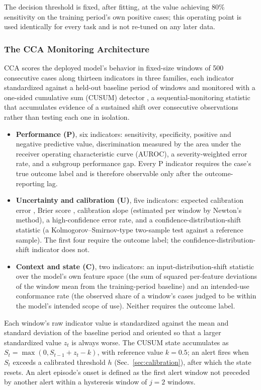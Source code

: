 \documentclass[preprintsapa,article,submit,oneauthor]{Definitions/mdpi}
\begin{document}
The decision threshold is fixed, after fitting, at the value achieving 80\% sensitivity on the training period's own positive cases; this operating point is used identically for every task and is not re-tuned on any later data.

\subsubsection{The CCA Monitoring Architecture}\label{sec:indicators}

CCA scores the deployed model's behavior in fixed-size windows of 500 consecutive cases along thirteen indicators in three families, each indicator standardized against a held-out baseline period of windows and monitored with a one-sided cumulative sum (CUSUM) detector \citep{page1954}, a sequential-monitoring statistic that accumulates evidence of a sustained shift over consecutive observations rather than testing each one in isolation.

\begin{itemize}
\item \textbf{Performance (P)}, six indicators: sensitivity, specificity, positive and negative predictive value, discrimination measured by the area under the receiver operating characteristic curve (AUROC), a severity-weighted error rate, and a subgroup performance gap. Every P indicator requires the case's true outcome label and is therefore observable only after the outcome-reporting lag.
\item \textbf{Uncertainty and calibration (U)}, five indicators: expected calibration error \citep{naeini2015}, Brier score \citep{brier1950}, calibration slope (estimated per window by Newton's method), a high-confidence error rate, and a confidence-distribution-shift statistic (a Kolmogorov--Smirnov-type two-sample test against a reference sample). The first four require the outcome label; the confidence-distribution-shift indicator does not.
\item \textbf{Context and state (C)}, two indicators: an input-distribution-shift statistic over the model's own feature space (the sum of squared per-feature deviations of the window mean from the training-period baseline) and an intended-use conformance rate (the observed share of a window's cases judged to be within the model's intended scope of use). Neither requires the outcome label.
\end{itemize}

Each window's raw indicator value is standardized against the mean and standard deviation of the baseline period and oriented so that a larger standardized value $z_t$ is always worse. The CUSUM state accumulates as $S_t = \max(0, S_{t-1} + z_t - k)$, with reference value $k = 0.5$; an alert fires when $S_t$ exceeds a calibrated threshold $h$ (Sec.~\ref{sec:calibration}), after which the state resets. An alert episode's onset is defined as the first alert window not preceded by another alert within a hysteresis window of $j = 2$ windows.
\end{document}

